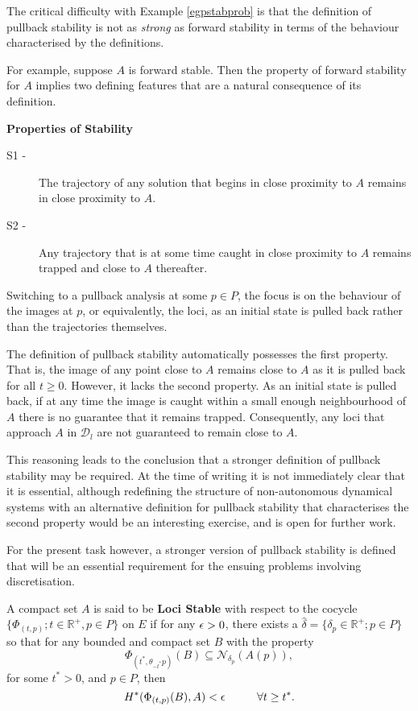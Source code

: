 The critical difficulty with Example \ref{egpstabprob} is that the definition of
pullback stability is not as \textit{strong} as forward stability in terms of
the behaviour characterised by the definitions.

For example, suppose $A$ is forward stable. Then the property of forward
stability for $A$ implies two defining features that are a natural consequence
of its definition.

\textbf{Properties of Stability}

\begin{description}
  \item[S1 - ] The trajectory of any solution that begins in close proximity to
$A$ remains in close proximity to $A$.
  \item[S2 - ] Any trajectory that is at some time caught in
close proximity to $A$ remains trapped and close to $A$ thereafter.
\end{description}

Switching to a pullback analysis at some $p \in P$, the focus is on the
behaviour of the images at $p$, or equivalently, the loci, as an initial state
is pulled back rather than the trajectories themselves.

The definition of pullback stability automatically possesses the first property.
That is, the image of any point close to $A$ remains close to $A$ as it
is pulled back for all $t \geq 0$. However, it lacks the second property. As an
initial state is pulled back, if at any time the image is caught within a small
enough neighbourhood of $A$ there is no guarantee that it remains trapped.
Consequently, any loci that approach $A$ in
$\mathcal{D}_l$ are not guaranteed to remain close to $A$.

This reasoning leads to the conclusion that a stronger definition of
pullback stability may be required. At the time of writing it is not
immediately clear that it is essential, although redefining the structure of
non-autonomous dynamical systems with an alternative definition for pullback
stability that characterises the second property would be an interesting
exercise, and is open for further work.

For the present task however, a stronger version of pullback
stability  is defined that will be an essential requirement for the ensuing
problems involving discretisation.

\begin{defn}\label{defnlocistab}
A compact set $A$ is said to be \textbf{Loci Stable} with
respect to the cocycle $\{ \Phi_{(t, p)} ; t \in \mathbb{R}^+, p \in P \}$ on
$E$ if for any $\epsilon > 0$, there exists a $\hat{\delta} = \{ \delta_p \in
\mathbb{R}^+ ; p \in P \}$ so that for any bounded and
compact set $B$ with the property
\[ \Phi_{(t^*, \theta_{-t^*}p)}(B) \subseteq
                     \mathcal{N}_{\delta_p}(A(p)), \]
for some $t^* > 0$, and $p \in P$, then
\[ H^*(\Phi_{(t, p)}(B), A) < \epsilon \hspace{1cm} \forall t \geq t^*. \]
\end{defn}


